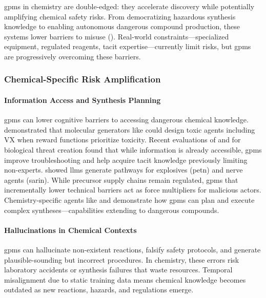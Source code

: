 \noindent \glspl{gpm} in chemistry are double-edged: they accelerate discovery while potentially amplifying chemical safety risks. From democratizing hazardous synthesis knowledge to enabling autonomous dangerous compound production, these systems lower barriers to misuse (). Real-world constraints---specialized equipment, regulated reagents, tacit expertise---currently limit risks, but \glspl{gpm} are progressively overcoming these barriers.

\subsubsection{Chemical-Specific Risk Amplification}

\paragraph{Information Access and Synthesis Planning} 
\glspl{gpm} can lower cognitive barriers to accessing dangerous chemical knowledge. \textcite{urbina2022dual} demonstrated that molecular generators like  could design toxic agents including VX when reward functions prioritize toxicity. Recent evaluations of  and  for biological threat creation found that while information is already accessible, \glspl{gpm} improve troubleshooting and help acquire tacit knowledge previously limiting non-experts.\autocite{openai2024building, anthropic2025system} \textcite{he2023control} showed \glspl{llm} generate pathways for explosives (\gls{petn}) and nerve agents (sarin). While precursor supply chains remain regulated, \glspl{gpm} that incrementally lower technical barriers act as force multipliers for malicious actors. Chemistry-specific agents like \autocite{bran2024augmenting} and \autocite{boiko2023autonomous} demonstrate how \glspl{gpm} can plan and execute complex syntheses---capabilities extending to dangerous compounds.

\paragraph{Hallucinations in Chemical Contexts} 
\glspl{gpm} can hallucinate non-existent reactions, falsify safety protocols, and generate plausible-sounding but incorrect procedures.\autocite{pantha2024challenges, ji2023survey} In chemistry, these errors risk laboratory accidents or synthesis failures that waste resources. Temporal misalignment due to static training data means chemical knowledge becomes outdated as new reactions, hazards, and regulations emerge.

